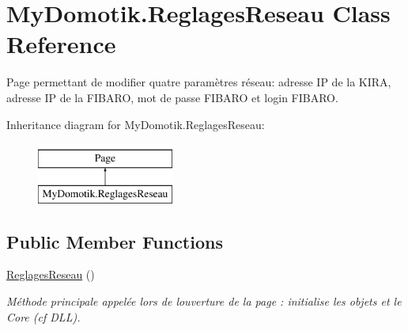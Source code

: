 \hypertarget{class_my_domotik_1_1_reglages_reseau}{}\section{My\+Domotik.\+Reglages\+Reseau Class Reference}
\label{class_my_domotik_1_1_reglages_reseau}


Page permettant de modifier quatre paramètres réseau\+: adresse IP de la K\+I\+RA, adresse IP de la F\+I\+B\+A\+RO, mot de passe F\+I\+B\+A\+RO et login F\+I\+B\+A\+RO.  


Inheritance diagram for My\+Domotik.\+Reglages\+Reseau\+:\begin{figure}[H]
\begin{center}
\leavevmode
\includegraphics[height=2.000000cm]{class_my_domotik_1_1_reglages_reseau}
\end{center}
\end{figure}
\subsection*{Public Member Functions}
\begin{DoxyCompactItemize}
\item 
\hyperlink{class_my_domotik_1_1_reglages_reseau_a557f04970aa7d6f793aec57d12bd525a}{Reglages\+Reseau} ()
\begin{DoxyCompactList}\small\item\em Méthode principale appelée lors de l\textquotesingle{}ouverture de la page \+: initialise les objets et le Core (cf D\+LL). \end{DoxyCompactList}\end{DoxyCompactItemize}
